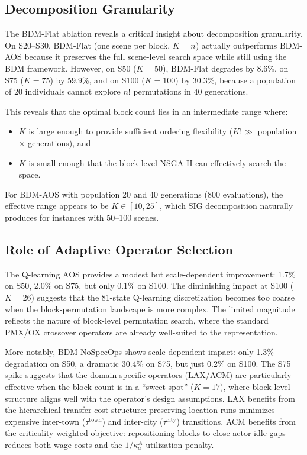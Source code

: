 \subsection{Decomposition Granularity}

The BDM-Flat ablation reveals a critical insight about decomposition granularity.
On S20--S30, BDM-Flat (one scene per block, $K{=}n$) actually outperforms BDM-AOS because it preserves the full scene-level search space while still using the BDM framework.
However, on S50 ($K{=}50$), BDM-Flat degrades by 8.6\%, on S75 ($K{=}75$) by 59.9\%, and on S100 ($K{=}100$) by 30.3\%, because a population of 20 individuals cannot explore $n!$ permutations in 40 generations.

This reveals that the optimal block count lies in an intermediate range where:
\begin{itemize}
    \item $K$ is large enough to provide sufficient ordering flexibility ($K! \gg$ population $\times$ generations), and
    \item $K$ is small enough that the block-level NSGA-II can effectively search the space.
\end{itemize}
For BDM-AOS with population 20 and 40 generations (800 evaluations), the effective range appears to be $K \in [10, 25]$, which SIG decomposition naturally produces for instances with 50--100 scenes.

\subsection{Role of Adaptive Operator Selection}

The Q-learning AOS provides a modest but scale-dependent improvement: 1.7\% on S50, 2.0\% on S75, but only 0.1\% on S100.
The diminishing impact at S100 ($K{=}26$) suggests that the 81-state Q-learning discretization becomes too coarse when the block-permutation landscape is more complex.
The limited magnitude reflects the nature of block-level permutation search, where the standard PMX/OX crossover operators are already well-suited to the representation.

More notably, BDM-NoSpecOps shows scale-dependent impact: only 1.3\% degradation on S50, a dramatic 30.4\% on S75, but just 0.2\% on S100.
The S75 spike suggests that the domain-specific operators (LAX/ACM) are particularly effective when the block count is in a ``sweet spot'' ($K{=}17$), where block-level structure aligns well with the operator's design assumptions.
LAX benefits from the hierarchical transfer cost structure: preserving location runs minimizes expensive inter-town ($\tau^{\text{town}}$) and inter-city ($\tau^{\text{city}}$) transitions.
ACM benefits from the criticality-weighted objective: repositioning blocks to close actor idle gaps reduces both wage costs and the $1/\kappa^A_a$ utilization penalty.

